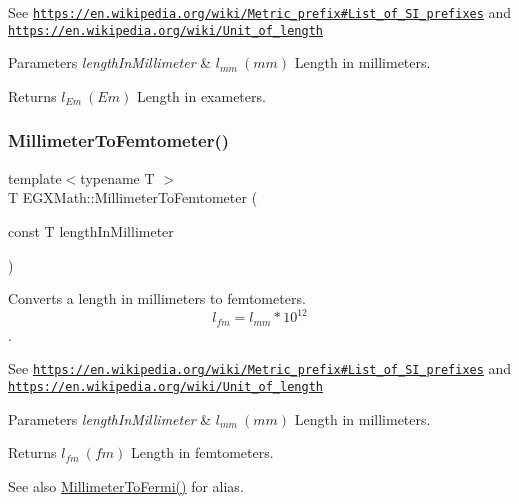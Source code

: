 See \href{https://en.wikipedia.org/wiki/Metric_prefix#List_of_SI_prefixes}{\tt https\+://en.\+wikipedia.\+org/wiki/\+Metric\+\_\+prefix\#\+List\+\_\+of\+\_\+\+S\+I\+\_\+prefixes} and \href{https://en.wikipedia.org/wiki/Unit_of_length}{\tt https\+://en.\+wikipedia.\+org/wiki/\+Unit\+\_\+of\+\_\+length} 
\begin{DoxyParams}{Parameters}
{\em length\+In\+Millimeter} & $ l_{mm}\ (mm)$ Length in millimeters. \\
\hline
\end{DoxyParams}
\begin{DoxyReturn}{Returns}
$ l_{Em}\ (Em)$ Length in exameters. 
\end{DoxyReturn}
\mbox{\label{group___e_g_x_math-_conversions-_length_conversions-_s_i-_millimeter-_s_i_gaa6dd55424b685e10484ca46e394b2e92}} 
\subsubsection{\texorpdfstring{Millimeter\+To\+Femtometer()}{MillimeterToFemtometer()}}
{\footnotesize\ttfamily template$<$typename T $>$ \\
T E\+G\+X\+Math\+::\+Millimeter\+To\+Femtometer (\begin{DoxyParamCaption}\item[{const T}]{length\+In\+Millimeter }\end{DoxyParamCaption})}



Converts a length in millimeters to femtometers. \[ l_{fm}=l_{mm} * 10^{12} \]. 

See \href{https://en.wikipedia.org/wiki/Metric_prefix#List_of_SI_prefixes}{\tt https\+://en.\+wikipedia.\+org/wiki/\+Metric\+\_\+prefix\#\+List\+\_\+of\+\_\+\+S\+I\+\_\+prefixes} and \href{https://en.wikipedia.org/wiki/Unit_of_length}{\tt https\+://en.\+wikipedia.\+org/wiki/\+Unit\+\_\+of\+\_\+length} 
\begin{DoxyParams}{Parameters}
{\em length\+In\+Millimeter} & $ l_{mm}\ (mm)$ Length in millimeters. \\
\hline
\end{DoxyParams}
\begin{DoxyReturn}{Returns}
$ l_{fm}\ (fm)$ Length in femtometers. 
\end{DoxyReturn}
\begin{DoxySeeAlso}{See also}
\mbox{\hyperlink{group___e_g_x_math-_conversions-_length_conversions-_s_i-_millimeter-_non-_s_i_gaeb57dff8b2e092b5a655ffdd9960897d}{Millimeter\+To\+Fermi()}} for alias. 
\end{DoxySeeAlso}
\mbox{\label{group___e_g_x_math-_conversions-_length_conversions-_s_i-_millimeter-_s_i_gaeadd93f73f66f5b904919def3d44e858}} 
